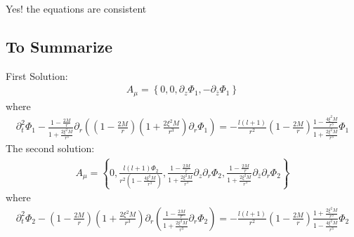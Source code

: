 \documentclass[12pt]{article}
\begin{document}
Yes! the equations are consistent





\subsection{To Summarize}
First Solution:
\begin{gather}
A_{\mu}
=
\left\{
0,0,
\partial_{z}\Phi_{1}
,
-\partial_{\bar{z}}
\Phi_{1}
\right\}
\end{gather}
where
\begin{gather}
\partial^{2}_{t}
\Phi_{1}
-
\frac{1 - \frac{2 M}{r}}{1 + \frac{2 \xi^{2} M}{r^{3}}}
\partial_{r}
\left(
(1 - \frac{2 M}{r})
(1 + \frac{2 \xi^{2} M}{r^{3}})
\partial_{r}
\Phi_{1}
\right)
=
-
\frac{l (l + 1)}{r^{2}}
(1 - \frac{2 M}{r})
\frac{1 - \frac{4  \xi^{2} M}{r^{3}} }{1 + \frac{2 \xi^{2} M}{r^{3}}}
\Phi_{1}
\end{gather}
The second solution:
\begin{gather}
A_{\mu}
=
\left\{
0,\frac{l (l + 1) \Phi_{2}}{r^{2} (1 - \frac{4 \xi^{2} M}{r^{3}})}
,
\frac{1 - \frac{2 M}{r}}{1 + \frac{2 \xi^{2} M}{r^{3}} }
\partial_{z}
\partial_{r}
\Phi_{2}
,
\frac{1 - \frac{2 M}{r}}{1 + \frac{2 \xi^{2} M}{r^{3}} }
\partial_{\bar{z}}
\partial_{r}
\Phi_{2}
\right\}
\end{gather}
where
\begin{gather}
\partial_{t}^{2}
\Phi_{2}
-
(1 - \frac{2 M}{r})
(1 + \frac{2 \xi^{2} M}{r^{3}})
\partial_{r}
\left(
\frac{1 - \frac{2 M}{r}}{1 + \frac{2 \xi^{2} M}{r^{3}}}
\partial_{r}
\Phi_{2}
\right)
=-
\frac{l (l + 1)}{r^{2}}
(1 - \frac{2 M}{r})
\frac{1 + \frac{2 \xi^{2} M}{r^{3}}}{1 - \frac{4 \xi^{2} M}{r^{3}}}
\Phi_{2}
\end{gather}
\end{document}

